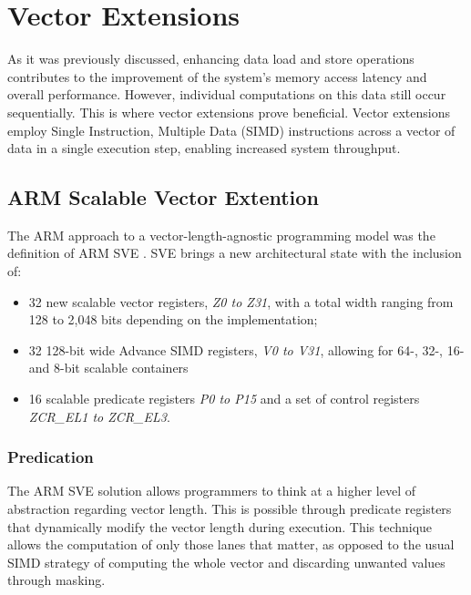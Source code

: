 \section{Vector Extensions}

As it was previously discussed, enhancing data load and store operations contributes to the improvement of the system's memory access latency and overall performance. However, individual computations on this data still occur sequentially. This is where vector extensions prove beneficial. Vector extensions employ Single Instruction, Multiple Data (SIMD) instructions across a vector of data in a single execution step, enabling increased system throughput.


\subsection{ARM Scalable Vector Extention}
\label{label:arm-sve}

The ARM approach to a vector-length-agnostic programming model was the definition of ARM SVE \cite{arm-paper}. SVE brings a new architectural state with the inclusion of:
\begin{itemize}
    \item 32 new scalable vector registers, \textit{Z0 to Z31}, with a total width ranging from 128 to 2,048 bits depending on the implementation;
    \item 32 128-bit wide Advance SIMD registers, \textit{V0 to V31}, allowing for 64-, 32-, 16- and 8-bit scalable containers
    \item 16 scalable predicate registers \textit{P0 to P15} and a set of control registers \textit{ZCR\_EL1 to ZCR\_EL3}.
\end{itemize}


\subsubsection{Predication}
The ARM SVE solution allows programmers to think at a higher level of abstraction regarding vector length. This is possible through predicate registers that dynamically modify the vector length during execution. This technique allows the computation of only those lanes that matter, as opposed to the usual SIMD strategy of computing the whole vector and discarding unwanted values through masking.

